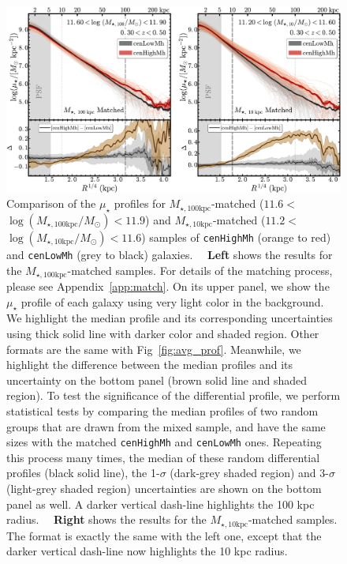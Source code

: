 \documentclass[a4paper,fleqn,usenatbib]{mnras}
\def\rbcg{\texttt{cenHighMh}}
\def\nbcg{\texttt{cenLowMh}}
\def\minn{{$M_{\star,10\mathrm{kpc}}$}}
\def\mtot{{$M_{\star,100\mathrm{kpc}}$}}
\def\logminn{{$\log (M_{\star,10\mathrm{kpc}}/M_{\odot})$}}
\def\logmtot{{$\log (M_{\star,100\mathrm{kpc}}/M_{\odot})$}}
\def\mden{{$\mu_{\star}$}}
\begin{document}
  \begin{figure}
      \centering 
      \includegraphics[width=\textwidth]{fig/redbcg_prof_1}
      \caption{
          Comparison of the \mden{} profiles for \mtot{}-matched 
          ($11.6<$\logmtot{}$<11.9$) and \minn{}-matched ($11.2<$\logminn{}$<11.6$) 
          samples of \rbcg{} (orange to red) and \nbcg{} (grey to black) galaxies.~~
          \textbf{Left} shows the results for the \mtot{}-matched samples.
          For details of the matching process, please see Appendix~\ref{app:match}.  
          On its upper panel, we show the \mden{} profile of each galaxy using very light 
          color in the background.  
          We highlight the median profile and its corresponding uncertainties using thick 
          solid line with darker color and shaded region. 
          Other formats are the same with Fig~\ref{fig:avg_prof}.
          Meanwhile, we highlight the difference between the median profiles and its 
          uncertainty on the bottom panel (brown solid line and shaded region).
          To test the significance of the differential profile, we perform statistical
          tests by comparing the median profiles of two random groups that are drawn 
          from the mixed sample, and have the same sizes with the matched \rbcg{} and
          \nbcg{} ones.
          Repeating this process many times, the median of these random differential 
          profiles (black solid line), the 1-$\sigma$ (dark-grey shaded region) and 
          3-$\sigma$ (light-grey shaded region) uncertainties are shown on the bottom 
          panel as well. 
          A darker vertical dash-line highlights the 100 kpc radius.~~
          \textbf{Right} shows the results for the \minn{}-matched samples. 
          The format is exactly the same with the left one, except that the darker 
          vertical dash-line now highlights the 10 kpc radius.
          }
      \label{fig:prof_1} 
  \end{figure}
\end{document}
